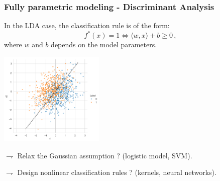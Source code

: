 \documentclass[xcolor={usenames,dvipsnames}]{beamer}
\begin{document}
\begin{frame}\frametitle{Fully parametric modeling - Discriminant Analysis}


In the LDA case, the classification rule is of the form:
\begin{equation*}
f^*(x) = 1 \Leftrightarrow \langle w,x \rangle + b \geqslant 0\,,
\end{equation*}
where \alert{$w$ and $b$ depends on the model parameters}.

\begin{center}
\includegraphics[width=5cm]{./logistic.png} 
\end{center}

$\rightharpoondown$ Relax the Gaussian assumption ? (\alert{logistic model, SVM}).

$\rightharpoondown$ Design  nonlinear classification rules ? (\alert{kernels, neural networks}).

\end{frame}
\end{document}
